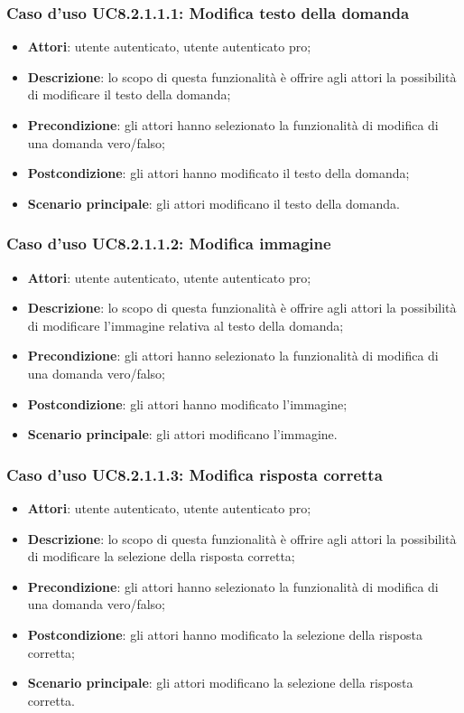 \subsubsection{Caso d'uso UC8.2.1.1.1: Modifica testo della domanda}
	\begin{itemize}
		\item
			\textbf{Attori}: utente autenticato, utente autenticato pro;
		\item		
			\textbf{Descrizione}: lo scopo di questa funzionalità è offrire agli attori la possibilità di modificare il testo della domanda;
		\item
			\textbf{Precondizione}: gli attori hanno selezionato la funzionalità di modifica di una domanda vero/falso; 
		\item
			\textbf{Postcondizione}: gli attori hanno modificato il testo della domanda;
		\item
			\textbf{Scenario principale}: gli attori modificano il testo della domanda. 		
	\end{itemize}
	
\subsubsection{Caso d'uso UC8.2.1.1.2: Modifica immagine}
	\begin{itemize}
		\item
			\textbf{Attori}: utente autenticato, utente autenticato pro;
		\item		
			\textbf{Descrizione}: lo scopo di questa funzionalità è offrire agli attori la possibilità di modificare l'immagine relativa al testo della domanda;
		\item
			\textbf{Precondizione}: gli attori hanno selezionato la funzionalità di modifica di una domanda vero/falso; 
		\item
			\textbf{Postcondizione}: gli attori hanno modificato l'immagine;
		\item
			\textbf{Scenario principale}: gli attori modificano l'immagine. 	
	\end{itemize}
	
\subsubsection{Caso d'uso UC8.2.1.1.3: Modifica risposta corretta}
	\begin{itemize}
		\item
			\textbf{Attori}: utente autenticato, utente autenticato pro;
		\item		
			\textbf{Descrizione}: lo scopo di questa funzionalità è offrire agli attori la possibilità di modificare la selezione della risposta corretta;
		\item
			\textbf{Precondizione}: gli attori hanno selezionato la funzionalità di modifica di una domanda vero/falso; 
		\item
			\textbf{Postcondizione}: gli attori hanno modificato la selezione della risposta corretta;
		\item
			\textbf{Scenario principale}: gli attori modificano la selezione della risposta corretta. 
	 			
	\end{itemize}
	